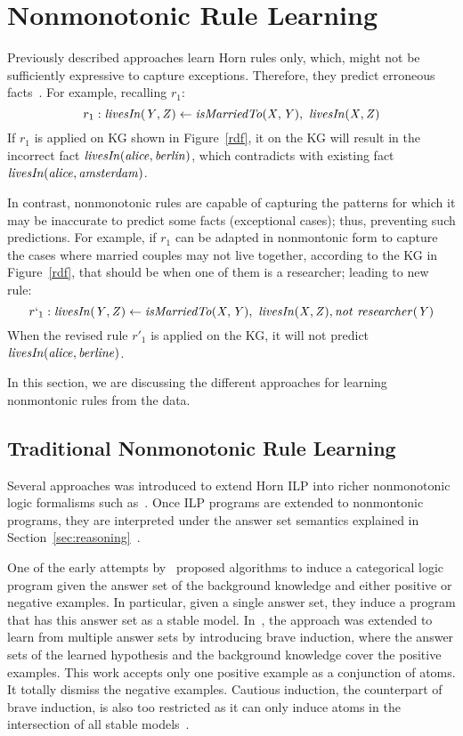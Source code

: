 \section{Nonmonotonic Rule Learning}\label{sec:nmrulelearn}

Previously described approaches learn Horn rules only, which, might not be sufficiently expressive to capture
exceptions. Therefore, they predict erroneous facts~\cite{rumis}. For example, recalling $r_1$:
\[r_1 : \mathit{livesIn(Y,Z)} \leftarrow \mathit{isMarriedTo(X,Y)},\ \mathit{livesIn(X,Z)} \]
If $r_1$ is applied on KG shown in Figure~\ref{rdf}, it on the KG will result in the incorrect fact $\mathit{livesIn(alice,berlin)}$, which contradicts with existing fact $\mathit{livesIn(alice, amsterdam)}$. 

In contrast, nonmonotonic rules are capable of capturing the patterns for which it may be inaccurate to predict some facts (\ie exceptional cases); thus, preventing such predictions. For example, if $r_1$ can be adapted in nonmontonic form to capture the cases where married couples may not live together, according to the KG in Figure~\ref{rdf}, that should be when one of them is a researcher; leading to new rule:
\[r`_1 : \mathit{livesIn(Y,Z)} \leftarrow \mathit{isMarriedTo(X,Y)},\ \mathit{livesIn(X,Z)}, \mathit{not}~ \mathit{researcher(Y)}\]
When the revised rule $r'_1$ is applied on the KG, it will not predict $\mathit{livesIn(alice,berline)}$. 

In this section, we are discussing the different approaches for learning nonmontonic rules from the data.


\subsection{Traditional Nonmonotonic Rule Learning}
Several approaches was introduced to extend Horn ILP into richer nonmonotonic logic formalisms such as~\cite{DBLP:conf/ijcai/InoueK97,DBLP:journals/tocl/Sakama05,R08,CorapiRL10,ILASP_system}. Once ILP programs are extended to nonmontonic programs, they are interpreted under the answer set semantics explained in Section~\ref{sec:reasoning}~\cite{Shakerin2018}.


One of the early attempts by~\cite{DBLP:journals/tocl/Sakama05} proposed algorithms to induce a categorical logic program given the answer set of the background knowledge and either positive or negative examples. In particular, given a single answer set, they induce a program that has this answer set as a stable model. In~\cite{Sakama2009}, the approach was extended to learn from multiple answer sets by introducing brave induction, where the answer sets of the learned hypothesis and the background knowledge cover the positive examples. This work accepts only one positive example as a conjunction of atoms. It totally dismiss the negative examples. Cautious induction, the counterpart of brave induction, is also too restricted as
it can only induce atoms in the intersection of all stable models~\cite{Shakerin2018}.


